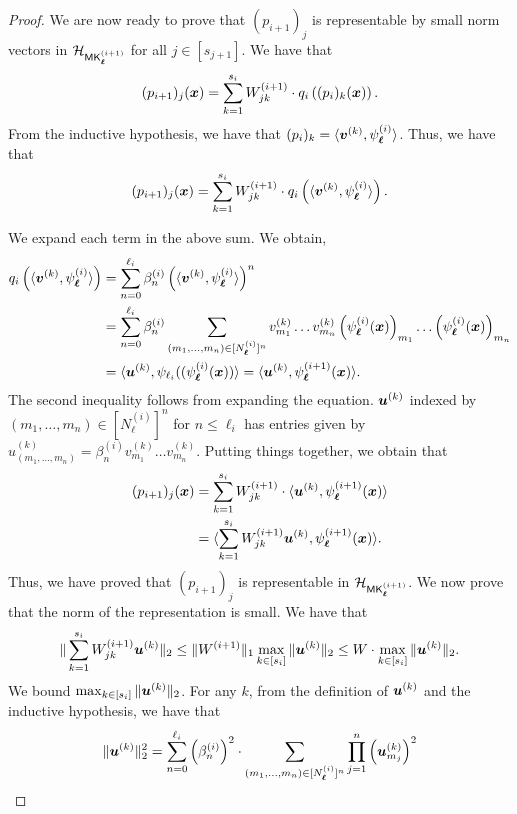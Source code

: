 \begin{proof}
    We are now ready to prove that $(p_{i+1})_j$ is representable by small norm vectors in $\mathcal{H}_{\mathsf{MK}_{\boldsymbol{\ell}}^{(i+1)}}$ for all $j\in [s_{j+1}]$. We have that 
\[
        (p_{i+1})_{j}({\bm{x}})=\sum_{k=1}^{s_{i}}W^{(i+1)}_{jk}\cdot q_{i}\left((p_{i})_{k}({\bm{x}})\right).
\]
From the inductive hypothesis, we have that $(p_i)_{k}=\langle{\bm{v}}^{(k)},\psi_{\boldsymbol{\ell}}^{(i)}\rangle$. Thus, we have that
\[
 (p_{i+1})_{j}({\bm{x}})=\sum_{k=1}^{s_{i}}W^{(i+1)}_{jk}\cdot q_{i}\left(\langle{\bm{v}}^{(k)},\psi_{\boldsymbol{\ell}}^{(i)}\rangle\right).
\]

We expand each term in the above sum. We obtain,
\begin{align*}
q_{i}\left(\langle{\bm{v}}^{(k)},\psi_{\boldsymbol{\ell}}^{(i)}\rangle\right)&=\sum_{n=0}^{\ell_i}\beta^{(i)}_{n}\left(\langle{\bm{v}}^{(k)},\psi_{\boldsymbol{\ell}}^{(i)}\rangle\right)^{n}\\
&=\sum_{n=0}^{\ell_i}\beta^{(i)}_{n}\sum_{(m_1,\ldots,m_n)\in [N_{\boldsymbol{\ell}}^{(i)}]^{n}}v^{(k)}_{m_1}\ldots v^{(k)}_{m_n}\left(\psi_{\boldsymbol{\ell}}^{(i)}({\bm{x}})\right)_{m_1}\ldots \left(\psi_{\boldsymbol{\ell}}^{(i)}({\bm{x}})\right)_{m_n}\\
&=\langle {\bm{u}}^{(k)},\psi_{\ell_i}((\psi_{\boldsymbol{\ell}}^{(i)}({\bm{x}}))\rangle=\langle{\bm{u}}^{(k)},\psi_{\boldsymbol{\ell}}^{(i+1)}({\bm{x}})\rangle.\end{align*}
The second inequality follows from expanding the equation. ${\bm{u}}^{(k)}$ indexed by $(m_1,\ldots, m_n)\in [N^{(i)}_{\ell}]^n$ for $n\leq \ell_i$ has entries given by 
$u^{(k)}_{(m_1,\ldots,m_n)}=\beta^{(i)}_n v^{(k)}_{m_1}\ldots v^{(k)}_{m_n}$. Putting things together, we obtain that
\begin{align*}
    (p_{i+1})_{j}({\bm{x}})&=\sum_{k=1}^{s_{i}}W^{(i+1)}_{jk}\cdot\langle{\bm{u}}^{(k)},\psi_{\boldsymbol{\ell}}^{(i+1)}({\bm{x}})\rangle\\
    &=\langle\sum_{k=1}^{s_i}W^{(i+1)}_{jk}{\bm{u}}^{(k)},\psi_{\boldsymbol{\ell}}^{(i+1)}({\bm{x}})\rangle.
\end{align*}
Thus, we have proved that $(p_{i+1})_{j}$ is representable in $\mathcal{H}_{\mathsf{MK}_{\boldsymbol{\ell}}^{(i+1)}}$. We now prove that the norm of the representation is small. We have that 
\begin{align*}
    \|\sum_{k=1}^{s_i}W^{(i+1)}_{jk}{\bm{u}}^{(k)}\|_{2}\leq \|W^{(i+1)}\|_1\max_{k\in [s_i]}\|{\bm{u}}^{(k)}\|_{2}\leq W\cdot\max_{k\in [s_i]}\|{\bm{u}}^{(k)}\|_{2}.
\end{align*}
We bound $\max_{k\in [s_i]}\|{\bm{u}}^{(k)}\|_{2}$. For any $k$, from the definition of ${\bm{u}}^{(k)}$ and the inductive hypothesis, we have that 
\begin{align*}
\twonorm{\vu^{(k)}}^2&=\sum_{n=0}^{\ell_i}\left(\beta^{(i)}_{n}\right)^2\cdot\sum_{(m_1,\ldots,m_n)\in [N^{(i)}_{\vell}]^n}\prod_{j=1}^{n}\left(\vu^{(k)}_{m_j}\right)^2\\

\end{align*}
\end{proof}
